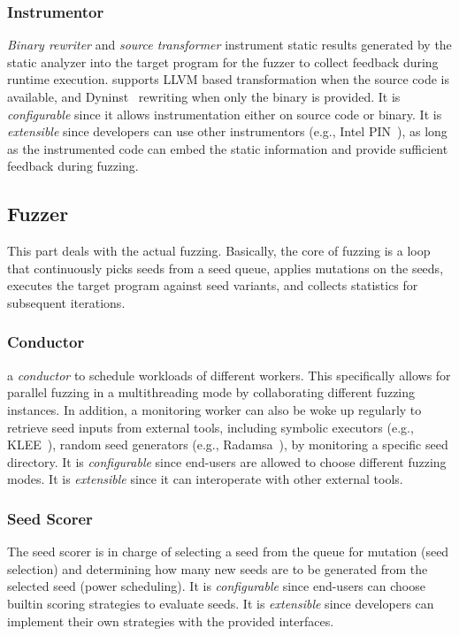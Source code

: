 \subsubsection{Instrumentor}
\emph{Binary rewriter} and \emph{source transformer} instrument static results generated by the static analyzer into the target program for the fuzzer to collect feedback during runtime execution.
{\FOT} supports LLVM based transformation when the source code is available, and Dyninst~\cite{dyninst} rewriting when only the binary is provided.
It is \textit{configurable} since it allows instrumentation either on source code or binary.
It is \textit{extensible} since developers can use other instrumentors (e.g., Intel PIN~\cite{pin}), as long as the instrumented code can embed the static information and provide sufficient feedback during fuzzing.

\subsection{Fuzzer}
This part deals with the actual fuzzing. 
Basically, the core of fuzzing is a loop that continuously picks seeds from a seed queue, applies mutations on the seeds, executes the target program against seed variants, and collects statistics for subsequent iterations.

\subsubsection{Conductor}
{\FOT} a \emph{conductor} to schedule workloads of different workers. This specifically allows for parallel fuzzing in a multithreading mode by collaborating different fuzzing instances. In addition, a monitoring worker can also be woke up regularly to retrieve seed inputs from external tools, including symbolic executors (e.g., KLEE~\cite{klee}), random seed generators (e.g., Radamsa~\cite{radamsa}), by monitoring a specific seed directory.
It is \textit{configurable} since end-users are allowed to choose different fuzzing modes.
It is \textit{extensible} since it can interoperate with other external tools.


\subsubsection{Seed Scorer}
The seed scorer is in charge of selecting a seed from the queue for mutation (seed selection) and determining how many new seeds are to be generated from the selected seed (power scheduling).
It is \textit{configurable} since end-users can choose builtin scoring strategies to evaluate seeds.
It is \textit{extensible} since developers can implement their own strategies with the provided interfaces.


